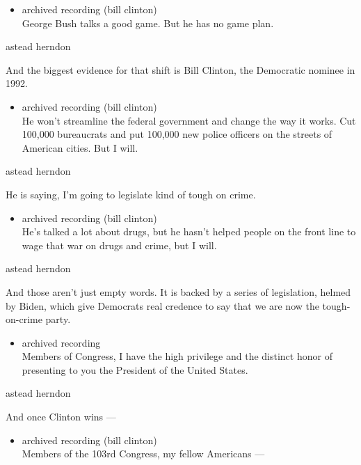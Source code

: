 \begin{itemize}
\tightlist
\item
  archived recording (bill clinton)\\
  George Bush talks a good game. But he has no game plan.
\end{itemize}

astead herndon

And the biggest evidence for that shift is Bill Clinton, the Democratic
nominee in 1992.

\begin{itemize}
\tightlist
\item
  archived recording (bill clinton)\\
  He won't streamline the federal government and change the way it
  works. Cut 100,000 bureaucrats and put 100,000 new police officers on
  the streets of American cities. But I will.
\end{itemize}

astead herndon

He is saying, I'm going to legislate kind of tough on crime.

\begin{itemize}
\tightlist
\item
  archived recording (bill clinton)\\
  He's talked a lot about drugs, but he hasn't helped people on the
  front line to wage that war on drugs and crime, but I will.
\end{itemize}

astead herndon

And those aren't just empty words. It is backed by a series of
legislation, helmed by Biden, which give Democrats real credence to say
that we are now the tough-on-crime party.

\begin{itemize}
\tightlist
\item
  archived recording\\
  Members of Congress, I have the high privilege and the distinct honor
  of presenting to you the President of the United States.
\end{itemize}

astead herndon

And once Clinton wins ---

\begin{itemize}
\tightlist
\item
  archived recording (bill clinton)\\
  Members of the 103rd Congress, my fellow Americans ---
\end{itemize}

